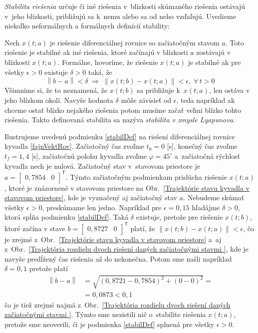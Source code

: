 \documentclass[a4paper, 10pt, ]{article}
\begin{document}
\emph{Stabilita riešenia} určuje či iné riešenia v~blízkosti skúmaného riešenia ostávajú v~jeho blízkosti, približujú sa k~nemu alebo sa od neho vzďaľujú. Uvedieme niekoľko neformálnych a formálnych definícií stability:

\noindent
Nech $x(t;a)$ je riešenie diferenciálnej rovnice so začiatočným stavom $a$. Toto riešenie je stabilné ak iné riešenia, ktoré začínajú v blízkosti $a$ zostávajú v blízkosti $x(t;a)$. Formálne, hovoríme, že riešenie $x(t;a)$ je stabilné ak pre všetky $\epsilon > 0$ existuje $\delta > 0$ taká, že
\begin{equation} \label{stabilDef}
	\left\| b - a \right\| < \delta \; \Rightarrow \; \left\| x(t;b) - x(t;a) \right\| < \epsilon, \; \forall \, t>0
\end{equation}
Všimnime si, že to neznamená, že $x(t;b)$ sa približuje k~$x(t;a)$, len ostáva v jeho blízkom okolí. Navyše hodnota $\delta$ môže závisieť od $\epsilon$, teda napríklad ak chceme ostať blízko nejakého riešenia potom musíme začať veľmi blízko tohto riešenia. Takto definovaná stabilita sa nazýva \emph{stabilita v zmysle Lyapunova}.

Ilustrujeme uvedenú podmienku \eqref{stabilDef} na riešení diferenciálnej rovnice kyvadla \eqref{fajnVektRov}. Začiatočný čas zvoľme $t_0 = 0$ [s], konečný čas zvoľme $t_f = 1,4$ [s], začiatočnú polohu kyvadla zvoľme $\varphi = 45^{\circ}$ a~začiatočná rýchlosť kyvadla nech je nulová. Začiatočný stav v~stavovom priestore je $a = \begin{bmatrix} 0,7854 & 0 \end{bmatrix}^\mathsf{T}$. Týmto začiatočným podmienkam prislúcha riešenie $x(t;a)$, ktoré je znázornené v stavovom priestore na Obr.~\ref{Trajektórie stavu kyvadla v stavovom priestore}, kde je vyznačený aj začiatočný stav $a$. Nebudeme skúmať všetky $\epsilon > 0$, preskúmame len jedno. Napríklad pre $\epsilon = 0,15$ hľadájme $\delta > 0$, ktorá spĺňa podmienku \eqref{stabilDef}. Taká $\delta$ existuje, pretože pre riešenie $x(t;b)$, ktoré začína v stave $b = \begin{bmatrix} 0,8727 & 0 \end{bmatrix}^\mathsf{T}$ platí, že $\left\| x(t;b) - x(t;a) \right\| < \epsilon$, čo je zrejmé z~Obr.~\ref{Trajektórie stavu kyvadla v stavovom priestore} a~aj z~Obr.~\ref{Trajektória rozdielu dvoch riešení daných začiatočnými stavmi }, kde je navyše predĺžený čas riešenia až do nekonečna. Potom sme našli napríklad $\delta = 0,1$ pretože platí
\begin{equation}
	\begin{split}
		\left\| b - a \right\| &= \sqrt{(0,8721 - 0,7854)^2 + (0 - 0)^2} = \\
		&= 0,0873 < 0,1
	\end{split}
\end{equation}
čo je tiež zrejmé najmä z~Obr.~\ref{Trajektória rozdielu dvoch riešení daných začiatočnými stavmi }. Týmto sme nezistili nič o~stabilite riešenia $x(t;a)$, pretože sme neoverili, či je podmienka \eqref{stabilDef} splnená pre všetky $\epsilon > 0$.
\end{document}
